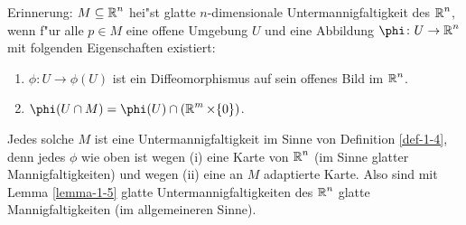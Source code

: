 \begin{bem}
  Erinnerung: $M \subseteq \operatorname{\mathbb{R}}^n$ hei"st glatte $n$-dimensionale Untermannigfaltigkeit des $\operatorname{\mathbb{R}}^n$, wenn f"ur alle $p \in M$ eine offene Umgebung $U$ und eine Abbildung $\phi \colon U \to \R^n$  mit folgenden Eigenschaften existiert:
  \begin{enumerate}[label=(\roman*),widest=ii]
  \item $\phi \colon U \to \phi(U)$ ist ein Diffeomorphismus auf sein offenes Bild im $\operatorname{\mathbb{R}}^{n}$.
  \item $\phi(U \cap M) = \phi(U) \cap (\R^{m} \times \{0\})$.
  \end{enumerate}
Jedes solche $M$ ist eine Untermannigfaltigkeit im Sinne von Definition \ref{def-1-4}, denn jedes $\phi$ wie oben ist wegen (i) eine Karte von $\operatorname{\mathbb{R}}^n$ (im Sinne glatter Mannigfaltigkeiten) und wegen (ii) eine an $M$ adaptierte Karte. Also sind mit Lemma \ref{lemma-1-5} glatte Untermannigfaltigkeiten des $\operatorname{\mathbb{R}}^n$ glatte Mannigfaltigkeiten (im allgemeineren Sinne).
\end{bem}

